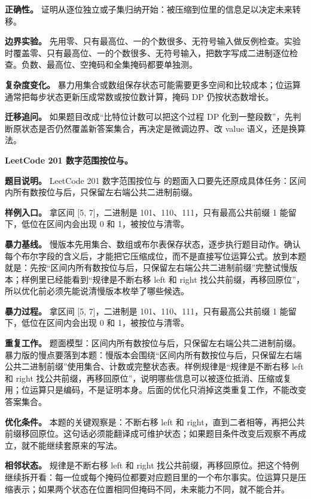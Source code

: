 \textbf{正确性。} 证明从逐位独立或子集归纳开始：被压缩到位里的信息足以决定未来转移。

\textbf{边界实验。} 先用零、只有最高位、一的个数很多、无符号输入做反例检查。实验时覆盖零、只有最高位、一的个数很多、无符号输入，把数字写成二进制逐位检查。负数、最高位、空掩码和全集掩码都要单独测。

\textbf{复杂度变化。} 暴力用集合或数组保存状态可能需要更多空间和比较成本；位运算通常把每步状态更新压成常数或按位数计算，掩码 DP 仍按状态数增长。

\textbf{迁移追问。} 如果题目改成“比特位计数可以把这个过程 DP 化到一整段数”，先判断原状态是否仍然覆盖新答案集合，再决定是微调边界、改 value 语义，还是换算法。

\noindent\textbf{LeetCode 201 数字范围按位与。}

\textbf{题目说明。} LeetCode 201 数字范围按位与 的题面入口要先还原成具体任务：区间内所有数按位与后，只保留左右端公共二进制前缀。

\textbf{样例入口。} 拿区间 [5, 7]，二进制是 101、110、111，只有最高公共前缀 1 能留下，低位在区间内会出现 0 和 1，被按位与清零。

\textbf{暴力基线。} 慢版本先用集合、数组或布尔表保存状态，逐步执行题目动作。确认每个布尔字段的含义后，才能把它压缩成位，而不是直接写位运算公式。放到本题就是：先按“区间内所有数按位与后，只保留左右端公共二进制前缀”完整试慢版本；样例里已经能看到“规律是不断右移 left 和 right 找公共前缀，再移回原位”，所以优化前必须先能说清慢版本枚举了哪些候选。

\textbf{暴力过程。} 拿区间 [5, 7]，二进制是 101、110、111，只有最高公共前缀 1 能留下，低位在区间内会出现 0 和 1，被按位与清零。

\textbf{重复工作。} 题面模型：区间内所有数按位与后，只保留左右端公共二进制前缀。暴力版的慢点要落到本题：慢版本会围绕“区间内所有数按位与后，只保留左右端公共二进制前缀”使用集合、计数或完整状态表。样例规律是“规律是不断右移 left 和 right 找公共前缀，再移回原位”，说明哪些信息可以被逐位抵消、压缩或复用；位运算只是编码，不是证明本身。后面的优化只消掉这类重复工作，不能改变答案集合。

\textbf{优化条件。} 本题的关键观察是：不断右移 left 和 right，直到二者相等，再把公共前缀移回原位。这句话必须能翻译成可维护状态；如果题目条件改变后观察不再成立，就不能继续套原来的写法。

\textbf{相邻状态。} 规律是不断右移 left 和 right 找公共前缀，再移回原位。把这个特例继续拆开看：每一位或每个掩码位都要对应题目里的一个布尔事实。位运算只是压缩表示；如果两个状态在位置相同但掩码不同，未来能力不同，就不能合并。

